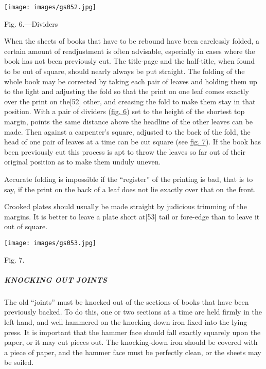 \documentclass[
]{article}
\begin{document}
\protect\hypertarget{Fig_6}{}{}
\texttt{[image: images/gs052.jpg]}

Fig. 6.---Dividers

When the sheets of books that have to be rebound have been carelessly
folded, a certain amount of readjustment is often advisable, especially
in cases where the book has not been previously cut. The title-page and
the half-title, when found to be out of square, should nearly always be
put straight. The folding of the whole book may be corrected by taking
each pair of leaves and holding them up to the light and adjusting the
fold so that the print on one leaf comes exactly over the print on
the{\protect\hypertarget{Page_52}{}{{[}52{]}}} other, and creasing the
fold to make them stay in that position. With a pair of dividers
(\protect\hyperlink{Fig_6}{fig. 6}) set to the height of the shortest
top margin, points the same distance above the headline of the other
leaves can be made. Then against a carpenter's square, adjusted to the
back of the fold, the head of one pair of leaves at a time can be cut
square (see \protect\hyperlink{Fig_7}{fig. 7}). If the book has been
previously cut this process is apt to throw the leaves so far out of
their original position as to make them unduly uneven.

Accurate folding is impossible if the ``register'' of the printing is
bad, that is to say, if the print on the back of a leaf does not lie
exactly over that on the front.

Crooked plates should usually be made straight by judicious trimming of
the margins. It is better to leave a plate short
at{\protect\hypertarget{Page_53}{}{{[}53{]}}} tail or fore-edge than to
leave it out of square.

\protect\hypertarget{Fig_7}{}{}
\texttt{[image: images/gs053.jpg]}

Fig. 7.

\hypertarget{knocking-out-joints}{%
\subparagraph{KNOCKING OUT JOINTS}\label{knocking-out-joints}}

The old ``joints'' must be knocked out of the sections of books that
have been previously backed. To do this, one or two sections at a time
are held firmly in the left hand, and well hammered on the knocking-down
iron fixed into the lying press. It is important that the hammer face
should fall exactly squarely upon the paper, or it may cut pieces out.
The knocking-down iron should be covered with a piece of paper, and the
hammer face must be perfectly clean, or the sheets may be soiled.
\end{document}
